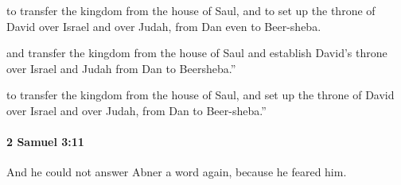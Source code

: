 			\begin{versebox}
					\item[BHS] 
					\item[ASV] to transfer the kingdom from the house of Saul, and to set up the throne of David over Israel and over Judah, from Dan even to Beer-sheba.
					\item[NIV] and transfer the kingdom from the house of Saul and establish David’s throne over Israel and Judah from Dan to Beersheba.”
					\item[NRSV] to transfer the kingdom from the house of Saul, and set up the throne of David over Israel and over Judah, from Dan to Beer-sheba.”
			\end{versebox}

		\paragraph{2 Samuel 3:11} %
			\label{2SAMUEL-3-11}

			And he could not answer Abner a word again, because he feared him.

